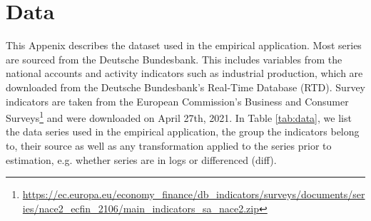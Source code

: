 \documentclass[notitlepage,a4paper,12pt]{article}
\newcommand{\transpose}[1]{{#1}^{\sf{T}}}
\begin{document}


\section{Data}
\label{app:data}
This Appenix describes the dataset used in the empirical application. Most series are sourced from the Deutsche Bundesbank. This includes variables from the national accounts and activity indicators such as industrial production, which are downloaded from the Deutsche Bundesbank's Real-Time Database (RTD). Survey indicators are taken from the European Commission's Business and Consumer Surveys\footnote{\url{https://ec.europa.eu/economy_finance/db_indicators/surveys/documents/series/nace2_ecfin_2106/main_indicators_sa_nace2.zip}} and were downloaded on April 27th, 2021. In Table \ref{tab:data}, we list the data series used in the empirical application, the group the indicators belong to, their source as well as any transformation applied to the series prior to estimation, e.g. whether series are in logs or differenced (diff). 
\end{document}
